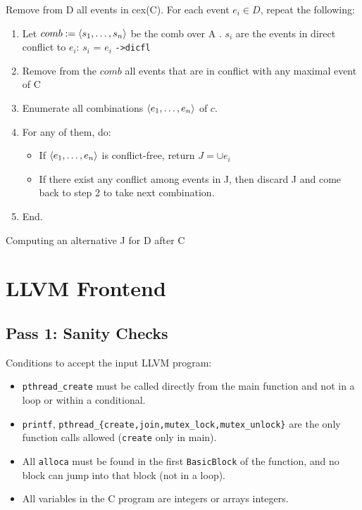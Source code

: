 \documentclass{llncs}
\begin{document}

\begin{algorithm}
\noindent
Remove from D all events in cex(C).
For each event $e_i \in D$, repeat the following:
\begin{enumerate}
\item
	Let $comb \mathrel{:=} \langle s_1, \ldots, s_n\rangle$ be the comb over A . 
	$s_i$ are the events in direct conflict to $e_i$: $s_i$ = $e_i$ \verb!->dicfl!
\item
	Remove from the $comb$ all events that are in conflict with any maximal event of C
\item
	Enumerate all combinations $\langle e_1, \ldots, e_n\rangle$ of $c$.
\item
	For any of them, do:
	\begin{itemize}
		\item 
    		If $\langle e_1, \ldots, e_n\rangle$ is conflict-free, return $J = \cup e_i$ 
   		\item
			If there exist any conflict among events in J, then discard J and come back to step 2
			to take next combination.
	\end{itemize}
\item End.
\end{enumerate}
\caption{Computing an alternative J for D after C}
\label{a:alter}
\end{algorithm}


\section{LLVM Frontend}

\subsection*{Pass 1: Sanity Checks}

Conditions to accept the input LLVM program:

\begin{itemize}
\item
  \verb!pthread_create! must be called directly from the main function and not
  in a loop or within a conditional.
\item
  \verb!printf!,
  \verb!pthread_{create,join,mutex_lock,mutex_unlock}! are the only function calls
  allowed (\verb!create! only in main).
\item
  All \verb!alloca! must be found in the first \verb!BasicBlock! of the
  function, and no block can jump into that block (not in a loop).
\item
  All variables in the C program are integers or arrays integers.
\end{itemize}
\end{document}
